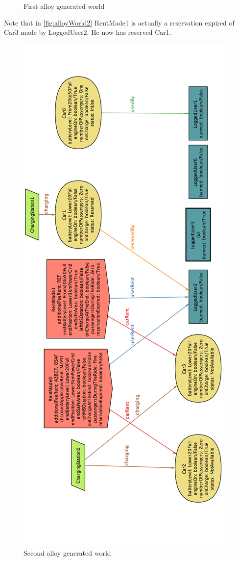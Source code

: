 \begin{appendices}
\begin{figure}[h!]
			\caption{
				\label{fig:alloyWorld1} 
				First alloy generated world
			}
		\end{figure}
		\clearpage
		Note that in \autoref{fig:alloyWorld2} RentMade1 is actually a reservation expired of Car3 made by LoggedUser2. He now has reserved Car1.
		\begin{figure}[h!]
		\centering
		\includegraphics[scale=0.39]{alloy/AlloyWorld1.png}
		\caption{
			\label{fig:alloyWorld2} 
			Second alloy generated world
		}
		\end{figure}
		\clearpage

\end{appendices}

